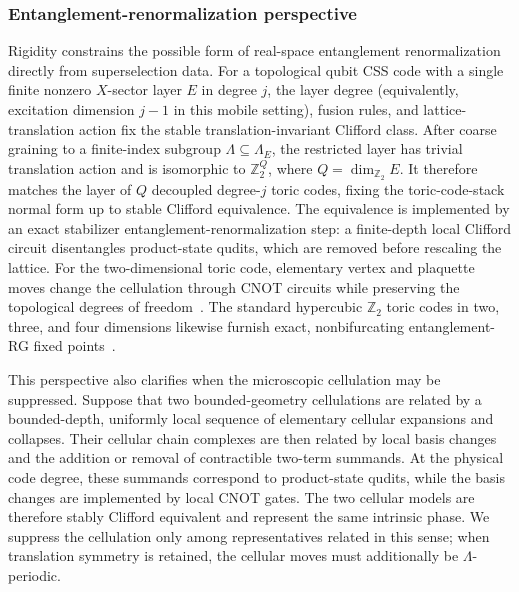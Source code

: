 \documentclass[aps,prx,english,superscriptaddress,twocolumn,tightenlines,showpacs,longbibliography,floatfix,amsfonts]{revtex4-2}
\theoremstyle{remark}
\theoremstyle{definition}
\begin{document}
\subsubsection{Entanglement-renormalization perspective}
\label{subsubsec:entanglement-renormalization}

Rigidity constrains the possible form of real-space entanglement
renormalization directly from superselection data. For a topological qubit CSS
code with a single finite nonzero \(X\)-sector layer \(E\) in degree \(j\), the
layer degree (equivalently, excitation dimension \(j-1\) in this mobile
setting), fusion rules, and lattice-translation action fix the stable
translation-invariant Clifford class. After coarse graining to a finite-index
subgroup \(\Lambda\subseteq\Lambda_E\), the restricted layer has trivial
translation action and is isomorphic to \(\mathbb Z_2^Q\), where
\(Q=\dim_{\mathbb Z_2}E\). It therefore matches the layer of \(Q\) decoupled
degree-\(j\) toric codes, fixing the toric-code-stack normal form up to stable
Clifford equivalence.
The equivalence is implemented by an exact stabilizer
entanglement-renormalization step: a finite-depth local Clifford circuit
disentangles product-state qudits, which are removed before rescaling the
lattice. For the two-dimensional toric code, elementary vertex and plaquette
moves change the cellulation through CNOT circuits while preserving the
topological degrees of freedom~\cite{AguadoVidal2008Entanglement,Aguado2011Disentanglement}.
The standard hypercubic \(\mathbb Z_2\) toric codes in two, three, and four
dimensions likewise furnish exact, nonbifurcating entanglement-RG fixed
points~\cite{Haah2014Bifurcation}.

This perspective also clarifies when the microscopic cellulation may be
suppressed. Suppose that two bounded-geometry cellulations are related by a
bounded-depth, uniformly local sequence of elementary cellular expansions
and collapses. Their cellular chain complexes are then related by local basis
changes and the addition or removal of contractible two-term summands. At the
physical code degree, these summands correspond to product-state qudits,
while the basis changes are implemented by local CNOT gates. The two cellular
models are therefore stably Clifford equivalent and represent the same
intrinsic phase. We suppress the cellulation only among representatives
related in this sense; when translation symmetry is retained, the cellular
moves must additionally be \(\Lambda\)-periodic.
\end{document}
